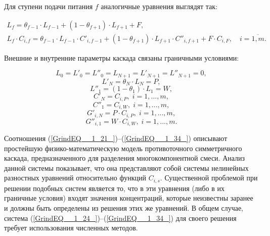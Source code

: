 Для ступени подачи питания $f$ аналогичные уравнения выглядят так:

\begin{equation} \label{GrindEQ__1_27_} 
  \begin{array}{l} {L_{f} =\theta _{f-1} \cdot L_{f-1} +(1-\theta _{f+1} ) \cdot L_{f+1} +F, } \\
  {L_{f} \cdot C_{i,f} =\theta _{f-1} \cdot L_{f-1} \cdot C'_{i,f-1} +(1-\theta _{f+1} ) \cdot L_{f+1}  \cdot C''_{i,f+1} + F \cdot C_{i,F} ,\quad i=\overline{1,m}.}\end{array}    
\end{equation}

Внешние и внутренние параметры каскада связаны граничными условиями:

\begin{equation} \label{GrindEQ__1_28_} 
  L_{0} =L'_{0} =L''_{0} =L_{N+1} =L'_{N+1} =L''_{N+1} =0, 
  \end{equation} 
  \begin{equation} \label{GrindEQ__1_29_} 
  L'_{N} =\theta _{N} \cdot L_{N} =P,        
  \end{equation} 
  \begin{equation} \label{GrindEQ__1_30_} 
  L''_{1} =(1-\theta _{1} )\cdot L_{1} =W,        
  \end{equation} 
  \begin{equation} \label{GrindEQ__1_31_} 
  C'_{N} =C_{i,P} ,\; i=1,...,m, 
  \end{equation} 
  \begin{equation} \label{GrindEQ__1_32_} 
  C''_{1} =C_{i,W} ,\; i=1,...,m, 
  \end{equation} 
  \begin{equation} \label{GrindEQ__1_33_} 
  G'_{i,N} =P \cdot C_{i,P} ,\; i=1,...,m, 
  \end{equation} 
  \begin{equation} \label{GrindEQ__1_34_} 
  G''_{i,1} =W \cdot C_{i,W} ,\; i=1,...,m. 
\end{equation} 

Соотношения (\ref{GrindEQ__1_21_})--(\ref{GrindEQ__1_34_}) описывают простейшую физико-математическую модель противоточного симметричного каскада, предназначенного для разделения многокомпонентной смеси. Анализ данной системы показывает, что она представляют собой системы нелинейных разностных уравнений относительно функций $C_{i,s}$. Существенной проблемой при решении подобных систем является то, что в эти уравнения (либо в их граничные условия) входят значения концентраций, которые неизвестны заранее и должны быть определены из решения этих же уравнений. В общем случае, система (\ref{GrindEQ__1_24_})--(\ref{GrindEQ__1_34_}) для своего решения требует использования численных методов.

